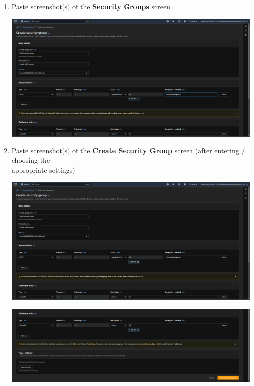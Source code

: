 \documentclass[11pt]{article}
\begin{document}
\begin{enumerate}[resume]
    \item Paste screenshot$($s$)$ of the \textbf{Security Groups} screen \\
    \vspace{5mm}

    {\centering
    \includegraphics[width=5.8in]{pics/11.png}
    }

    \item Paste screenshot$($s$)$ of the \textbf{Create Security Group} screen (after entering / choosing the \\ appropriate settings) \\
    \vspace{5mm}

    {\centering
    \includegraphics[width=5.8in]{pics/12_a.png}
    }

    {\centering
    \includegraphics[width=5.8in]{pics/12_b.png}
    }


\end{enumerate}
\end{document}
